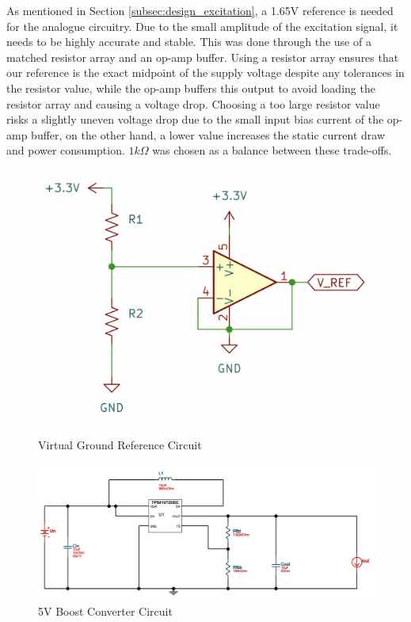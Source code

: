 As mentioned in Section \ref{subsec:design_excitation}, a 1.65V reference is needed for the analogue circuitry. Due to the small amplitude of the excitation signal, it needs to be highly accurate and stable. This was done through the use of a matched resistor array and an op-amp buffer. Using a resistor array ensures that our reference is the exact midpoint of the supply voltage despite any tolerances in the resistor value, while the op-amp buffers this output to avoid loading the resistor array and causing a voltage drop. Choosing a too large resistor value risks a slightly uneven voltage drop due to the small input bias current of the op-amp buffer, on the other hand, a lower value increases the static current draw and power consumption. $1k\Omega$ was chosen as a balance between these trade-offs.

\begin{figure}[H]
    \centering
    \begin{minipage}{0.35\textwidth}
        \centering
        \includegraphics[width=\textwidth]{Vground.png}
        \caption[Virtual Ground Reference Circuit]{\newline Virtual Ground Reference Circuit}
        \label{fig:virtual_ground}
    \end{minipage}\hfill
    \begin{minipage}{0.6\textwidth}
        \centering
        \includegraphics[width=\textwidth]{5V_Reg.png}
        \caption{5V Boost Converter Circuit}
        \label{fig:5V_reg}
    \end{minipage}
\end{figure}

